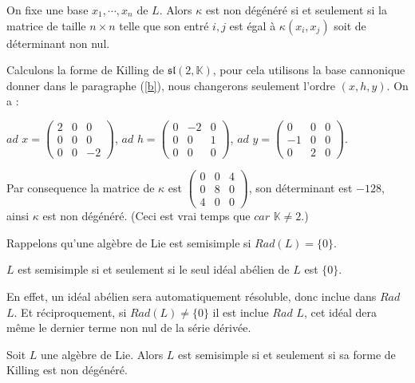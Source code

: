 \documentclass[a4paper,openany,12pt]{report}
\newcommand{\KK}{\mathbb{K}}
\newcommand{\ssl}{\mathfrak{sl}}
\theoremstyle{break}
{\theorembodyfont{\upshape}
\newtheorem*{rmq}{Remarque :}
\newtheorem*{prv}{Preuve :}
\newtheorem*{ex}{Exemples :}
\newtheorem*{exe}{Exemple : }
\newtheorem*{nota}{Notation :}
\newtheorem*{dem}{D\'emonstration :}}
\begin{document}
On fixe une base $x_1, \cdots, x_n$ de $L$. Alors $\kappa$ est non dégénéré si et seulement si la matrice de taille $n \times n$ telle que son entré $i,j$ est égal à $\kappa(x_i,x_j)$ soit de déterminant non nul. 

\begin{exe}
\quad Calculons la forme de Killing de $\ssl(2,\KK)$, pour cela utilisons la base cannonique donner dans le paragraphe (\ref{b}), nous changerons seulement l'ordre $(x,h,y)$. On a :
\begin{center}
$ad$ $x = \begin{pmatrix} 2 & 0 & 0 \\ 0 & 0 & 0 \\ 0 & 0 & -2 \end{pmatrix}$,
$ad$ $h = \begin{pmatrix} 0 & -2 & 0 \\ 0 & 0 & 1 \\ 0 & 0 & 0 \end{pmatrix}$,
$ad$ $y = \begin{pmatrix} 0 & 0 & 0 \\ -1 & 0 & 0 \\ 0 & 2 & 0 \end{pmatrix}$.
\end{center} 
\quad Par consequence la matrice de $\kappa$ est 
$\begin{pmatrix} 
0 & 0 & 4 \\
0 & 8 & 0 \\
4 & 0 & 0
\end{pmatrix}$, son déterminant est $-128$, ainsi $\kappa$ est non dégénéré. (Ceci est vrai temps que $car$ $\KK \neq 2$.)
\end{exe}

\quad Rappelons qu'une algèbre de Lie est semisimple si $Rad(L)= \{0\}$. 

\begin{prop}
\quad $L$ est semisimple si et seulement si le seul idéal abélien de $L$ est $\{0\}$.
\end{prop}

\begin{prv}
\quad En effet, un idéal abélien sera automatiquement résoluble, donc inclue dans $Rad$ $L$. Et réciproquement, si $Rad(L) \neq \{0\}$ il est inclue $Rad$ $L$, cet idéal dera même le dernier terme non nul de la série dérivée.
\end{prv}

\begin{thm}
\quad Soit $L$ une algèbre de Lie. Alors $L$ est semisimple si et seulement si sa forme de Killing est non dégénéré. 
\end{thm}
\end{document}
